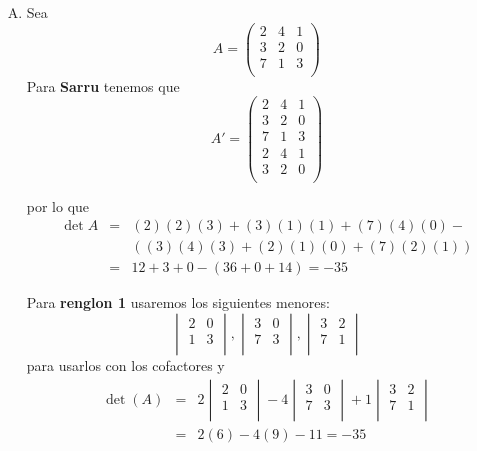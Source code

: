 \documentclass[12pt]{article}
\begin{document}
\newpage
\begin{multicols}{2}
	\begin{enumerate}[A.]
		\item Sea
			$$A = \begin{pmatrix}
				 2 &  4 &  1\\
				 3 &  2 &  0\\
				 7 &  1 &  3\\
			\end{pmatrix}$$
		Para \textbf{Sarru} tenemos que
			$$A' = \begin{pmatrix}
				 2 &  4 &  1\\
				 3 &  2 &  0\\
				 7 &  1 &  3\\
				 2 &  4 &  1\\
				 3 &  2 &  0\\
			\end{pmatrix}$$
		
		por lo que
			\begin{eqnarray*}	
				\det{A} &=& (2)(2)(3) + (3)(1)(1) + (7)(4)(0) - \\ & &(  
							(3)(4)(3) + (2)(1)(0) + (7)(2)(1) ) \\
						&=& 12+3+0 - (36+0+14) = -35
			\end{eqnarray*}
			
		Para \textbf{renglon 1} usaremos los siguientes menores:
			$$\begin{vmatrix}
				 2 &  0 \\
				 1 &  3 \\
			\end{vmatrix},
			\begin{vmatrix}
				 3 &  0 \\
				 7 &  3 \\
			\end{vmatrix},
			\begin{vmatrix}
				 3 &  2 \\
				 7 &  1 \\
			\end{vmatrix}$$
		para usarlos con los cofactores y
			\begin{eqnarray*}
				\det(A) &=&
					2 \begin{vmatrix}
						 2 &  0 \\
						 1 &  3 \\
					\end{vmatrix} -
					4 \begin{vmatrix}
						 3 &  0 \\
						 7 &  3 \\
					\end{vmatrix} +
					1 \begin{vmatrix}
						 3 &  2 \\
						 7 &  1 \\
					\end{vmatrix} \\
					&=& 2(6) - 4(9) - 11 = -35
			\end{eqnarray*}
			

\end{enumerate}
\end{multicols}
\end{document}
